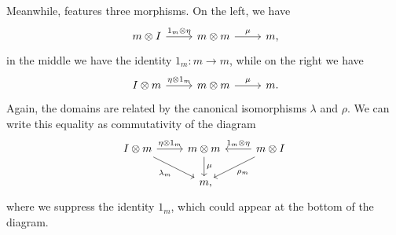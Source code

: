 Meanwhile,  features three morphisms. On the left, we have \[
  \begin{tikzcd}
    m\otimes I\ar[r, "1_m\otimes\eta"] & m\otimes m\ar[r, "\mu"] & m\punctuation{,}
  \end{tikzcd}
\] in the middle we have the identity $1_m: m\to m$, while on the right we have \[
  \begin{tikzcd}
    I\otimes m\ar[r, "\eta\otimes 1_m"] & m\otimes m\ar[r, "\mu"] & m\punctuation{.}
  \end{tikzcd}
\] Again, the domains are related by the canonical isomorphisms $\lambda$ and
$\rho$. We can write this equality as commutativity of the diagram \[
  \begin{tikzcd}
    I\otimes m\ar[r, "\eta\otimes 1_m"]\ar[dr, "\lambda_m"'] & m\otimes m\ar[d,
    "\mu"] & m\otimes I\ar[l, "1_m\otimes\eta"']\ar[dl, "\rho_m"]\\
                                        & m\punctuation{,}
  \end{tikzcd}
\]
where we suppress the identity $1_m$, which could appear at the bottom of the
diagram.





